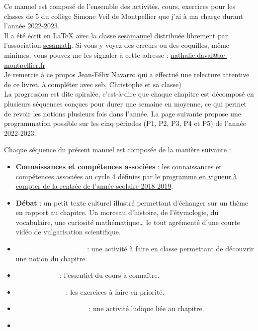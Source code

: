 

Ce manuel est composé de l'ensemble des activités, cours, exercices pour les classes de 5 du collège Simone Veil de Montpellier que j'ai à ma charge durant l'année 2022-2023. \\ [1mm]
Il a été écrit en \LaTeX{} avec la classe \href{https://www.ctan.org/pkg/sesamanuel}{\blue sesamanuel} distribuée librement par l'association \href{http://www.sesamath.net}{\blue sesamath}. Si vous y voyez des erreurs ou des coquilles, même minimes, vous pouvez me les signaler à cette adresse : \href{mailto:nathalie.daval@ac-montpellier.fr}{nathalie.daval@ac-montpellier.fr} \\
Je remercie à ce propos Jean-Félix Navarro qui a effectué une relecture attentive de ce livret. {\red à compléter avec seb, Christophe et sa classe)}  \\ [10mm]

La progression est dite spiralée, c'est-à-dire que chaque \og chapitre \fg{} est décomposé en plusieurs séquences conçues pour durer une semaine en moyenne, ce qui permet de revoir les notions plusieurs fois dans l'année. La page suivante propose une programmation possible sur les cinq périodes (P1, P2, P3, P4 et P5) de l'année 2022-2023.

Chaque séquence du présent manuel est composée de la manière suivante : \\
\begin{itemize}
   \item \textcolor{B2}{\sffamily\bfseries Connaissances et compétences associées} : les connaissances et compétences associées au cycle 4 définies par le \href{https://cache.media.eduscol.education.fr/file/A-Scolarite_obligatoire/37/5/Programme2020_cycle_3_comparatif_1313375.pdf}{programme en vigueur à compter de la rentrée de l'année scolaire 2018-2019}. \\
   \item \textcolor{B1}{\sffamily\bfseries Débat} : un petit texte culturel illustré permettant d'échanger sur un thème en rapport au chapitre. Un morceau d'histoire, de l'étymologie, du vocabulaire, une curiosité mathématique\dots{} le tout agrémenté d'une courte vidéo de vulgarisation scientifique. \\
   \item \colorbox{A2}{\textcolor{white}{\sffamily\bfseries Activité d'approche}} : une activité à faire en classe permettant de découvrir une notion du chapitre. \\
   \item \colorbox{A1}{\textcolor{white}{\sffamily\bfseries Trace écrite}} : l'essentiel du cours à connaître. \\
   \item \colorbox{B1}{\textcolor{white}{\sffamily\bfseries Entraînement}} : les exercices à faire en priorité.  \\   
   \item \colorbox{B2}{\textcolor{white}{\sffamily\bfseries Récréation, énigmes}} : une activité ludique liée au chapitre.
   \item
\end{itemize}


